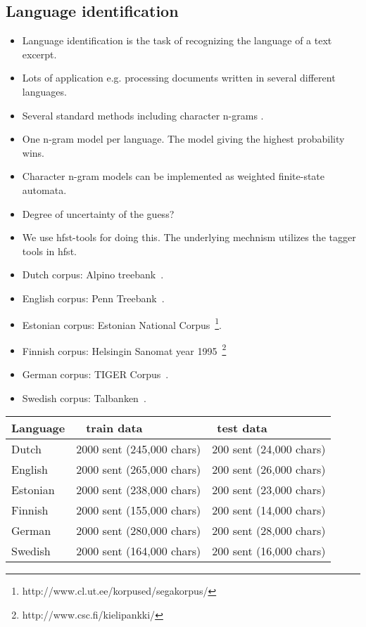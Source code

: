 \documentclass{llncs}
\begin{document}
\subsection{Language identification}
\begin{itemize}
\item Language identification is the task of recognizing the language
  of a text excerpt.
\item Lots of application e.g. processing documents written in several
  different languages.
\item Several standard methods including character n-grams \cite{cavnar/1994}.
\item One n-gram model per language. The model giving the highest
  probability wins.
\item Character n-gram models can be implemented as weighted
  finite-state automata.
\item Degree of uncertainty of the guess? 
\item We use hfst-tools for doing this. The underlying mechnism
  utilizes the tagger tools in hfst.
\item Dutch corpus: Alpino treebank~\cite{bouma/2000}.
\item English corpus: Penn Treebank~\cite{marcus/1993}.
\item Estonian corpus: Estonian National Corpus~\footnote{http://www.cl.ut.ee/korpused/segakorpus/}.
\item Finnish corpus: Helsingin Sanomat year 1995~\footnote{http://www.csc.fi/kielipankki/}
\item German corpus: TIGER Corpus~\cite{brants/2002}.
\item Swedish corpus: Talbanken~\cite{einarsson/1976}.

\end{itemize}

\begin{table}
\begin{tabular}{l|rr}
Language & train data~~~~~~~~~                 & test data~~~~~~~~~\\
\hline
Dutch    & 2000 sent (245,000 chars)  & 200 sent (24,000 chars)\\
English  & 2000 sent (265,000 chars)  & 200 sent (26,000 chars)\\
Estonian & 2000 sent (238,000 chars)  & 200 sent (23,000 chars)\\
Finnish  & 2000 sent (155,000 chars)  & 200 sent (14,000 chars)\\
German   & 2000 sent (280,000 chars)  & 200 sent (28,000 chars)\\
Swedish  & 2000 sent (164,000 chars)  & 200 sent (16,000 chars)\\
\end{tabular}
\end{table}
\end{document}
